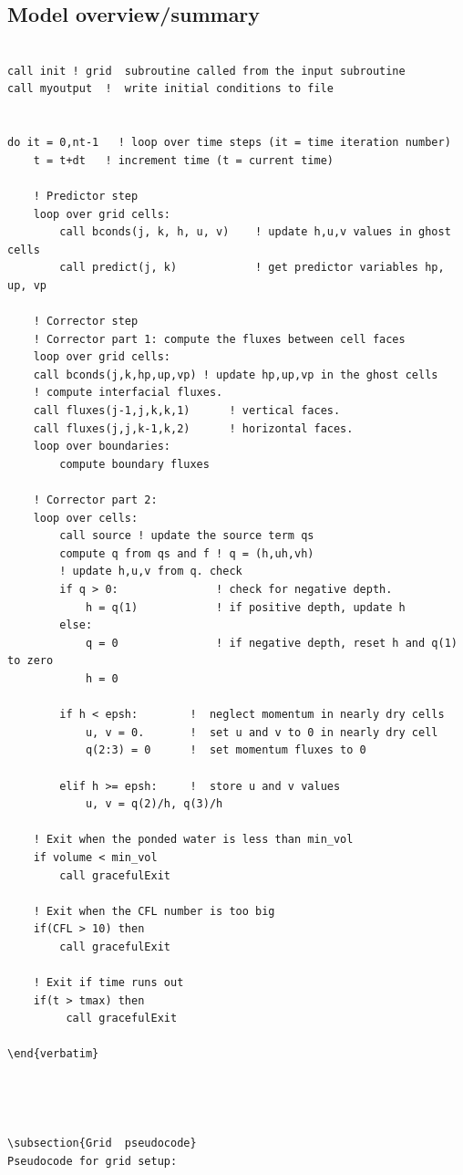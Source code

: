 \documentclass{article}
\begin{document}
\subsection{Model overview/summary}

\begin{lstlisting}
 
call init ! grid  subroutine called from the input subroutine
call myoutput  !  write initial conditions to file


do it = 0,nt-1   ! loop over time steps (it = time iteration number)
	t = t+dt   ! increment time (t = current time)

	! Predictor step
	loop over grid cells: 
		call bconds(j, k, h, u, v)    ! update h,u,v values in ghost cells
		call predict(j, k)            ! get predictor variables hp, up, vp

    ! Corrector step
	! Corrector part 1: compute the fluxes between cell faces
	loop over grid cells: 			  
    call bconds(j,k,hp,up,vp) ! update hp,up,vp in the ghost cells
    ! compute interfacial fluxes. 
    call fluxes(j-1,j,k,k,1)      ! vertical faces. 
    call fluxes(j,j,k-1,k,2)      ! horizontal faces.
	loop over boundaries:
		compute boundary fluxes
	
	! Corrector part 2: 
	loop over cells:
		call source ! update the source term qs
		compute q from qs and f	! q = (h,uh,vh)
		! update h,u,v from q. check 
	    if q > 0:				! check for negative depth.	
			h = q(1) 		    ! if positive depth, update h
	    else:
			q = 0 				! if negative depth, reset h and q(1) to zero
			h = 0					  
	
	    if h < epsh: 		!  neglect momentum in nearly dry cells
			u, v = 0.		!  set u and v to 0 in nearly dry cell	  
			q(2:3) = 0 		!  set momentum fluxes to 0
	    
	    elif h >= epsh:		!  store u and v values
	    	u, v = q(2)/h, q(3)/h
		    
    ! Exit when the ponded water is less than min_vol    
    if volume < min_vol
    	call gracefulExit
    	
    ! Exit when the CFL number is too big
    if(CFL > 10) then
        call gracefulExit
        
	! Exit if time runs out
    if(t > tmax) then
         call gracefulExit
            
\end{verbatim}




\subsection{Grid  pseudocode}
Pseudocode for grid setup: 


\end{lstlisting}
\end{document}

